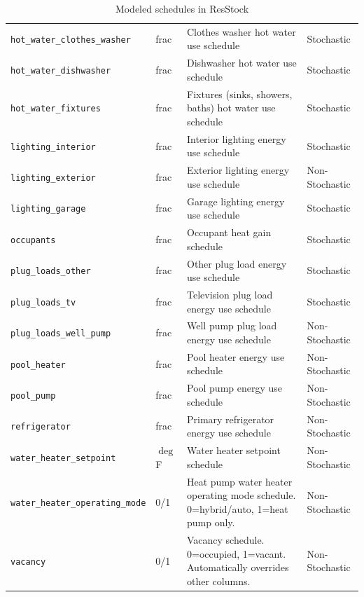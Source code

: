 \begin{table}
\begin{tabular}{l|l|l|l}
    \texttt{hot\_water\_clothes\_washer} & frac & Clothes washer hot water use schedule & Stochastic \\
    \texttt{hot\_water\_dishwasher} & frac & Dishwasher hot water use schedule & Stochastic \\
    \texttt{hot\_water\_fixtures} & frac & Fixtures (sinks, showers, baths) hot water use schedule & Stochastic \\
    \texttt{lighting\_interior} & frac & Interior lighting energy use schedule & Stochastic \\
    \texttt{lighting\_exterior} & frac & Exterior lighting energy use schedule & Non-Stochastic \\
    \texttt{lighting\_garage} & frac & Garage lighting energy use schedule & Stochastic \\
    \texttt{occupants} & frac & Occupant heat gain schedule & Stochastic \\
    \texttt{plug\_loads\_other} & frac & Other plug load energy use schedule & Stochastic \\
    \texttt{plug\_loads\_tv} & frac & Television plug load energy use schedule & Stochastic \\
    \texttt{plug\_loads\_well\_pump} & frac & Well pump plug load energy use schedule & Non-Stochastic \\
    \texttt{pool\_heater} & frac & Pool heater energy use schedule & Non-Stochastic \\
    \texttt{pool\_pump} & frac & Pool pump energy use schedule & Non-Stochastic \\
    \texttt{refrigerator} & frac & Primary refrigerator energy use schedule & Non-Stochastic \\
    \texttt{water\_heater\_setpoint} & $\deg$ F & Water heater setpoint schedule & Non-Stochastic \\
    \texttt{water\_heater\_operating\_mode} & 0/1 & Heat pump water heater operating mode schedule. 0=hybrid/auto, 1=heat pump only. & Non-Stochastic \\
    \texttt{vacancy} & 0/1 & Vacancy schedule. 0=occupied, 1=vacant. Automatically overrides other columns. & Non-Stochastic \\
    \hline
    \end{tabular}
    \caption{Modeled schedules in ResStock}
    \label{tab:schedules}
\end{table}


